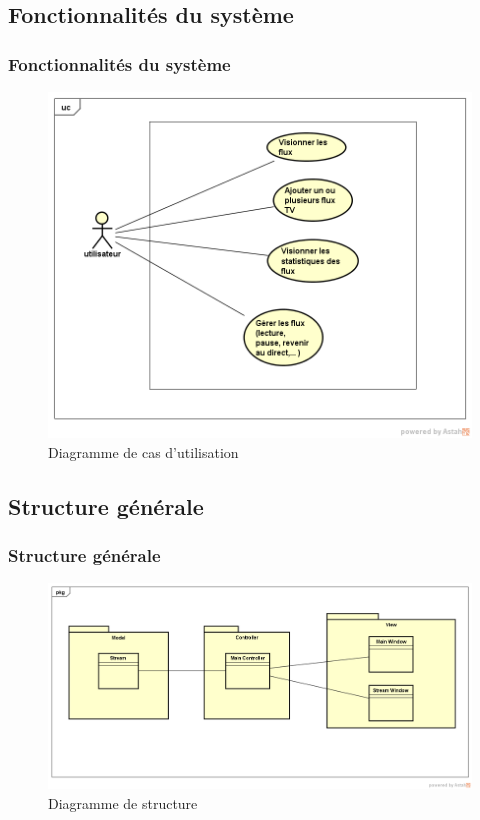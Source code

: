 \documentclass{beamer}
\begin{document}
\subsection{Fonctionnalités du système}

\begin{frame}	
\frametitle{Fonctionnalités du système}
	
\begin{figure}
	\includegraphics[scale=0.3]{Rapport_PR&D/images/UseCase}
	\caption{Diagramme de cas d'utilisation}
\end{figure}
	
\end{frame}


\subsection{Structure générale}

\begin{frame}	
\frametitle{Structure générale}

\begin{figure}
	\includegraphics[scale=0.28]{Rapport_PR&D/images/ClassDiagram}
	\caption{Diagramme de structure}
\end{figure}

\end{frame}
\end{document}
